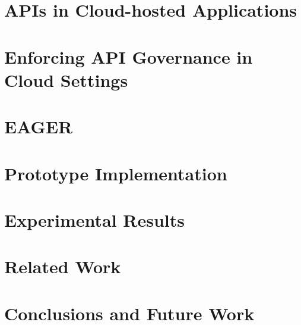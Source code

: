

\section{APIs in Cloud-hosted Applications}
\label{sec:eager_bg}


\section{Enforcing API Governance in Cloud Settings}
\label{sec:eager_enforce}


\section{EAGER}
\label{sec:eager_eager}


\section{Prototype Implementation}
\label{sec:eager_prototype_impl}


\section{Experimental Results}
\label{sec:eager_results}


\section{Related Work}
\label{sec:eager_related_work}


\section{Conclusions and Future Work}
\label{sec:eager_conc}

